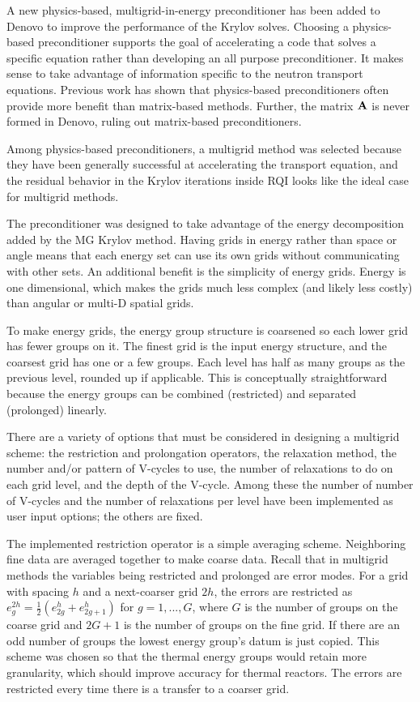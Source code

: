 A new physics-based, multigrid-in-energy preconditioner has been added to Denovo to improve the performance of the Krylov solves. Choosing a physics-based preconditioner supports the goal of accelerating a code that solves a specific equation rather than developing an all purpose preconditioner. It makes sense to take advantage of information specific to the neutron transport equations. Previous work has shown that physics-based preconditioners often provide more benefit than matrix-based methods. Further, the matrix $\mathbf{A}$ is never formed in Denovo, ruling out matrix-based preconditioners. 

Among physics-based preconditioners, a multigrid method was selected because they have been generally successful at accelerating the transport equation, and the residual behavior in the Krylov iterations inside RQI looks like the ideal case for multigrid methods.

The preconditioner was designed to take advantage of the energy decomposition added by the MG Krylov method. Having grids in energy rather than space or angle means that each energy set can use its own grids without communicating with other sets. An additional benefit is the simplicity of energy grids. Energy is one dimensional, which makes the grids much less complex (and likely less costly) than angular or multi-D spatial grids. 

To make energy grids, the energy group structure is coarsened so each lower grid has fewer groups on it. The finest grid is the input energy structure, and the coarsest grid has one or a few groups. Each level has half as many groups as the previous level, rounded up if applicable. This is conceptually straightforward because the energy groups can be combined (restricted) and separated (prolonged) linearly. 

There are a variety of options that must be considered in designing a multigrid scheme: the restriction and prolongation operators, the relaxation method, the number and/or pattern of V-cycles to use, the number of relaxations to do on each grid level, and the depth of the V-cycle. Among these the number of number of V-cycles and the number of relaxations per level have been implemented as user input options; the others are fixed. 

The implemented restriction operator is a simple averaging scheme. Neighboring fine data are averaged together to make coarse data. Recall that in multigrid methods the variables being restricted and prolonged are error modes. For a grid with spacing $h$ and a next-coarser grid $2h$, the errors are restricted as $e_{g}^{2h} = \frac{1}{2}(e_{2g}^{h} + e_{2g+1}^{h})$ for $g = 1,...,G$, where $G$ is the number of groups on the coarse grid and $2G+1$ is the number of groups on the fine grid. If there are an odd number of groups the lowest energy group's datum is just copied. This scheme was chosen so that the thermal energy groups would retain more granularity, which should improve accuracy for thermal reactors. The errors are restricted every time there is a transfer to a coarser grid.

